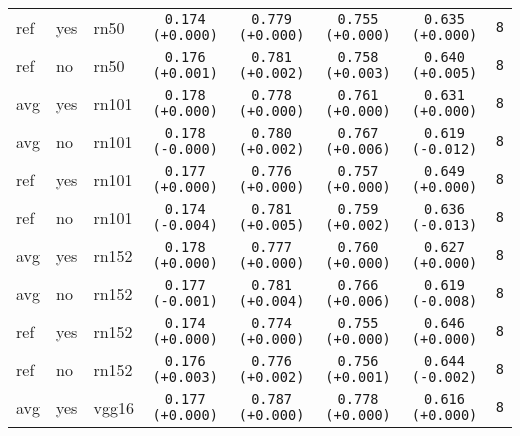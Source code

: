 \begin{tabular}{|l|l|l|c|c|c|c|c|}
\hline
\rowcolor{verylightgray}ref & yes & rn50 & \texttt{0.174 {\color{black}(+0.000)}} & \texttt{0.779 {\color{black}(+0.000)}} & \texttt{0.755 {\color{black}(+0.000)}} & \texttt{0.635 {\color{black}(+0.000)}} & \texttt{8} \\
ref & no & rn50 & \texttt{0.176 {\color{green}(+0.001)}} & \texttt{0.781 {\color{red}(+0.002)}} & \texttt{0.758 {\color{red}(+0.003)}} & \texttt{0.640 {\color{green}(+0.005)}} & \texttt{8} \\
\hline
\rowcolor{verylightgray}avg & yes & rn101 & \texttt{0.178 {\color{black}(+0.000)}} & \texttt{0.778 {\color{black}(+0.000)}} & \texttt{0.761 {\color{black}(+0.000)}} & \texttt{0.631 {\color{black}(+0.000)}} & \texttt{8} \\
avg & no & rn101 & \texttt{0.178 {\color{black}(-0.000)}} & \texttt{0.780 {\color{red}(+0.002)}} & \texttt{0.767 {\color{red}(+0.006)}} & \texttt{0.619 {\color{red}(-0.012)}} & \texttt{8} \\
\hline
\rowcolor{verylightgray}ref & yes & rn101 & \texttt{0.177 {\color{black}(+0.000)}} & \texttt{0.776 {\color{black}(+0.000)}} & \texttt{0.757 {\color{black}(+0.000)}} & \texttt{0.649 {\color{black}(+0.000)}} & \texttt{8} \\
ref & no & rn101 & \texttt{0.174 {\color{red}(-0.004)}} & \texttt{0.781 {\color{red}(+0.005)}} & \texttt{0.759 {\color{red}(+0.002)}} & \texttt{0.636 {\color{red}(-0.013)}} & \texttt{8} \\
\hline
\rowcolor{verylightgray}avg & yes & rn152 & \texttt{0.178 {\color{black}(+0.000)}} & \texttt{0.777 {\color{black}(+0.000)}} & \texttt{0.760 {\color{black}(+0.000)}} & \texttt{0.627 {\color{black}(+0.000)}} & \texttt{8} \\
avg & no & rn152 & \texttt{0.177 {\color{red}(-0.001)}} & \texttt{0.781 {\color{red}(+0.004)}} & \texttt{0.766 {\color{red}(+0.006)}} & \texttt{0.619 {\color{red}(-0.008)}} & \texttt{8} \\
\hline
\rowcolor{verylightgray}ref & yes & rn152 & \texttt{0.174 {\color{black}(+0.000)}} & \texttt{0.774 {\color{black}(+0.000)}} & \texttt{0.755 {\color{black}(+0.000)}} & \texttt{0.646 {\color{black}(+0.000)}} & \texttt{8} \\
ref & no & rn152 & \texttt{0.176 {\color{green}(+0.003)}} & \texttt{0.776 {\color{red}(+0.002)}} & \texttt{0.756 {\color{red}(+0.001)}} & \texttt{0.644 {\color{red}(-0.002)}} & \texttt{8} \\
\hline
\rowcolor{verylightgray}avg & yes & vgg16 & \texttt{0.177 {\color{black}(+0.000)}} & \texttt{0.787 {\color{black}(+0.000)}} & \texttt{0.778 {\color{black}(+0.000)}} & \texttt{0.616 {\color{black}(+0.000)}} & \texttt{8} \\

\end{tabular}
